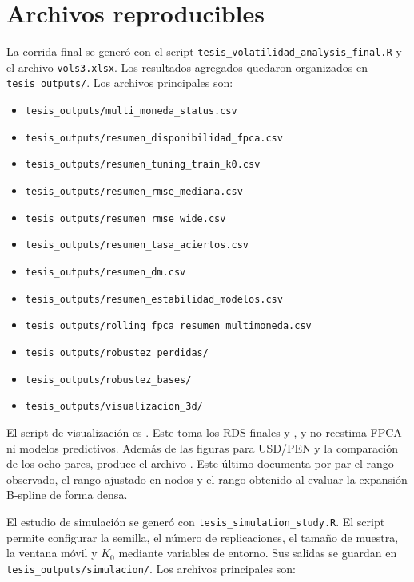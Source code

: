 \documentclass[a4paper,11pt]{article}
\begin{document}
\appendix
\section{Archivos reproducibles}

La corrida final se generó con el script \texttt{tesis\_volatilidad\_analysis\_final.R} y el archivo \texttt{vols3.xlsx}. Los resultados agregados quedaron organizados en \texttt{tesis\_outputs/}. Los archivos principales son:

\begin{itemize}
  \item \texttt{tesis\_outputs/multi\_moneda\_status.csv}
  \item \texttt{tesis\_outputs/resumen\_disponibilidad\_fpca.csv}
  \item \texttt{tesis\_outputs/resumen\_tuning\_train\_k0.csv}
  \item \texttt{tesis\_outputs/resumen\_rmse\_mediana.csv}
  \item \texttt{tesis\_outputs/resumen\_rmse\_wide.csv}
  \item \texttt{tesis\_outputs/resumen\_tasa\_aciertos.csv}
  \item \texttt{tesis\_outputs/resumen\_dm.csv}
  \item \texttt{tesis\_outputs/resumen\_estabilidad\_modelos.csv}
  \item \texttt{tesis\_outputs/rolling\_fpca\_resumen\_multimoneda.csv}
  \item \texttt{tesis\_outputs/robustez\_perdidas/}
  \item \texttt{tesis\_outputs/robustez\_bases/}
  \item \texttt{tesis\_outputs/visualizacion\_3d/}
\end{itemize}

El script de visualización es . Este toma los RDS finales y , y no reestima FPCA ni modelos predictivos. Además de las figuras para USD/PEN y la comparación de los ocho pares, produce el archivo . Este último documenta por par el rango observado, el rango ajustado en nodos y el rango obtenido al evaluar la expansión B-spline de forma densa.

El estudio de simulación se generó con \texttt{tesis\_simulation\_study.R}. El script permite configurar la semilla, el número de replicaciones, el tamaño de muestra, la ventana móvil y \(K_0\) mediante variables de entorno. Sus salidas se guardan en \texttt{tesis\_outputs/simulacion/}. Los archivos principales son:
\end{document}
